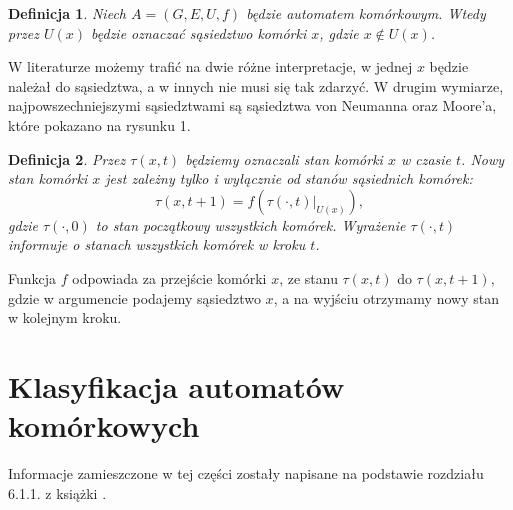 \documentclass[a4paper,12pt]{article}
\newtheorem{twr}{Definicja}
\begin{document}
\begin{twr}
Niech $A=(G,E,U,f)$ będzie automatem komórkowym. Wtedy przez $U(x)$ będzie oznaczać sąsiedztwo komórki $x$, gdzie $x\notin U(x)$. 
\end{twr} W literaturze możemy trafić na dwie różne interpretacje, w jednej $x$ będzie należał do sąsiedztwa, a  w innych nie musi się tak zdarzyć. W drugim wymiarze, najpowszechniejszymi sąsiedztwami są sąsiedztwa von Neumanna oraz  Moore'a, które pokazano na rysunku 1.\\
\begin{figure}
\centering
{}
\quad
{}
\caption{}
\end{figure}
\begin{twr}
Przez $\tau(x,t)$ będziemy oznaczali stan komórki $x$ w czasie $t$. Nowy stan komórki $x$ jest zależny tylko i wyłącznie od stanów sąsiednich komórek:
$$\tau(x,t+1)=f(\tau(\cdot,t)|_{U(x)}),$$
gdzie $\tau(\cdot,0)$ to stan początkowy wszystkich komórek. Wyrażenie $\tau(\cdot,t)$ informuje o stanach wszystkich komórek w kroku $t$.
\end{twr}
Funkcja $f$ odpowiada za przejście komórki $x$, ze stanu $\tau(x,t)$ do $\tau(x,t+1)$, gdzie w argumencie podajemy sąsiedztwo $x$, a na wyjściu otrzymamy nowy stan w kolejnym kroku.\\

\section{Klasyfikacja automatów komórkowych}
Informacje zamieszczone w tej części zostały napisane na podstawie rozdziału 6.1.1. z książki \cite{hill}.
\end{document}
